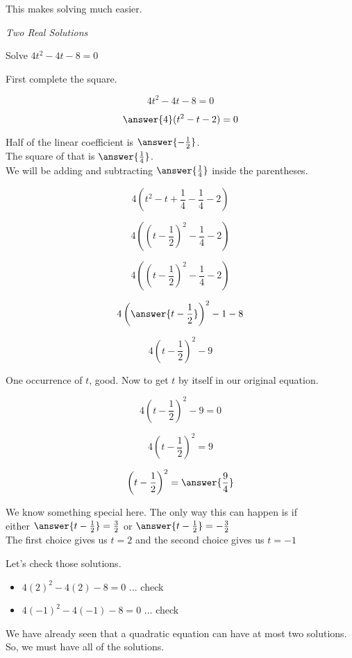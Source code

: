 \documentclass{ximera}
\begin{document}
This makes solving much easier.


\begin{example} \textit{Two Real Solutions}

Solve $4  t^2 - 4 t - 8 = 0$ \\


\begin{explanation}

First complete the square.



\[ 4 t^2 -  4 t - 8 = 0 \]

\[ \answer{4} (t^2 - t - 2) = 0 \]



Half of the linear coefficient is $\answer{-\frac{1}{2}}$. \\

The square of that is $\answer{\frac{1}{4}}$. \\

We will be adding and subtracting $\answer{\frac{1}{4}}$ inside the parentheses.




\[ 4 (t^2 - t + \frac{1}{4} - \frac{1}{4} - 2)  \]


\[ 4 \left(\left(t - \frac{1}{2}\right)^2 - \frac{1}{4} - 2\right)  \]


\[ 4 \left(\left(t - \frac{1}{2}\right)^2 - \frac{1}{4} - 2\right)  \]

\[ 4 \left( \answer{t - \frac{1}{2}} \right)^2 - 1 - 8  \]

\[ 4 \left(t - \frac{1}{2}\right)^2 - 9  \]


One occurrence of $t$, good. Now to get $t$ by itself in our original equation.

\[ 4 \left(t - \frac{1}{2}\right)^2 - 9 = 0  \]

\[ 4 \left(t - \frac{1}{2}\right)^2 = 9  \]

\[  \left(t - \frac{1}{2}\right)^2 = \answer{\frac{9}{4}}  \]

We know something special here. The only way this can happen is if \\



either   $\answer{t - \frac{1}{2}} = \frac{3}{2}$  or  $\answer{t - \frac{1}{2}} = -\frac{3}{2}$ \\

The first choice gives us $t = 2$ and the second choice gives us $t = -1$




Let's check those solutions.

\begin{itemize}
\item $4 (2)^2 - 4 (2) - 8 = 0$ ... check
\item $4 (-1)^2 - 4 (-1) - 8 = 0$ ... check
\end{itemize}



We have already seen that a quadratic equation can have at most two solutions.  So, we must have all of the solutions.

\end{explanation}


\end{example}
\end{document}
